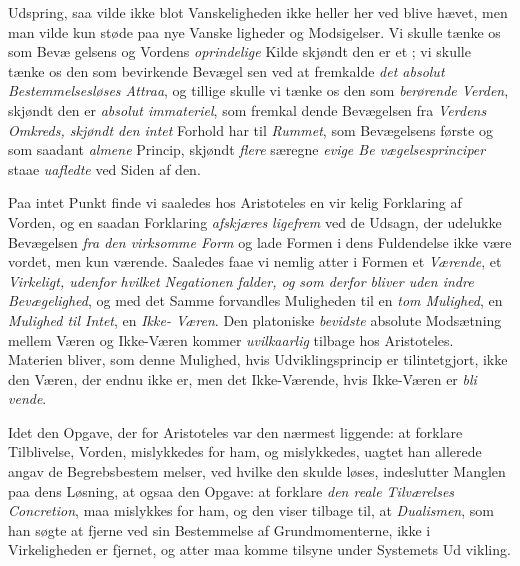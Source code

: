 Udspring, saa vilde ikke blot Vanskeligheden ikke heller her\-%
ved blive hævet, men man vilde kun støde paa nye Vanske\-%
ligheder og Modsigelser. Vi skulle tænke os  som Bevæ\-%
gelsens og Vordens \emph{oprindelige} Kilde skjøndt den er et
\emph{}; vi skulle tænke os den som bevirkende Bevægel\-%
sen ved at fremkalde \emph{det absolut Bestemmelsesløses
Attraa}, og tillige skulle vi tænke os den som \emph{berørende
Verden}, skjøndt den er \emph{absolut immateriel}, som fremkal\-%
dende Bevægelsen fra \emph{Verdens Omkreds, skjøndt den intet}
Forhold har til \emph{Rummet}, som Bevægelsens første og som
saadant \emph{almene} Princip, skjøndt \emph{flere} særegne \emph{evige Be\-%
vægelsesprinciper} staae \emph{uafledte} ved Siden af den.

Paa intet Punkt finde vi saaledes hos Aristoteles en vir\-%
kelig Forklaring af Vorden, og en saadan Forklaring \emph{afskjæres
ligefrem} ved de Udsagn, der udelukke Bevægelsen \emph{fra den
virksomme Form} og lade Formen i dens Fuldendelse ikke
være vordet, men kun værende. Saaledes faae vi nemlig atter
i Formen et \emph{Værende}, et \emph{Virkeligt, udenfor hvilket
Negationen falder, og som derfor bliver uden indre
Bevægelighed}, og med det Samme forvandles Muligheden
til en \emph{tom Mulighed}, en \emph{Mulighed til Intet}, en \emph{Ikke-%
Væren}. Den platoniske \emph{bevidste} absolute Modsætning
mellem Væren og Ikke-Væren kommer \emph{uvilkaarlig} tilbage
hos Aristoteles. Materien bliver, som denne Mulighed, hvis
Udviklingsprincip er tilintetgjort, ikke den Væren, der endnu
ikke er, men det Ikke-Værende, hvis Ikke-Væren er \emph{bli\-%
vende}.

Idet den Opgave, der for Aristoteles var den nærmest
liggende: at forklare Tilblivelse, Vorden, mislykkedes for ham,
og mislykkedes, uagtet han allerede angav de Begrebsbestem\-%
melser, ved hvilke den skulde løses, indeslutter Manglen paa
dens Løsning, at ogsaa den Opgave: at forklare \emph{den reale
Tilværelses Concretion}, maa mislykkes for ham, og den
viser tilbage til, at \emph{Dualismen}, som han søgte at fjerne ved
sin Bestemmelse af Grundmomenterne, ikke i Virkeligheden
er fjernet, og atter maa komme tilsyne under Systemets Ud\-%
vikling.


